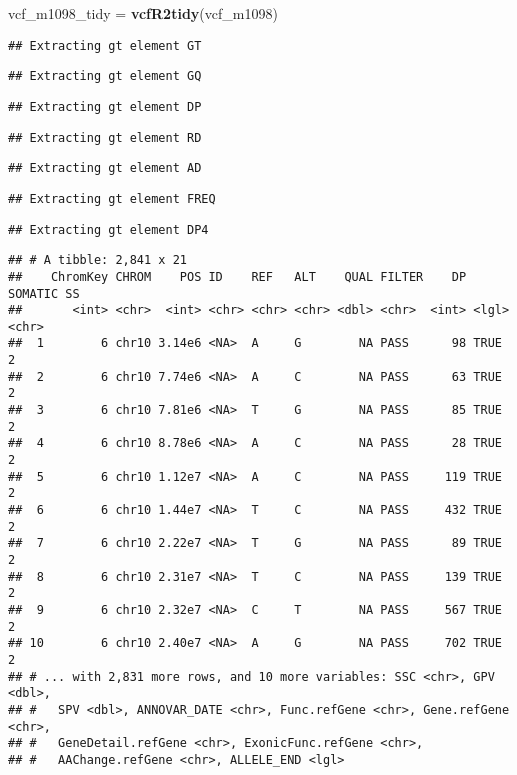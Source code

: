 \documentclass[]{article}
\newenvironment{Shaded}{\begin{snugshade}}{\end{snugshade}}
\newcommand{\KeywordTok}[1]{\textcolor[rgb]{0.13,0.29,0.53}{\textbf{#1}}}
\newcommand{\NormalTok}[1]{#1}
\newcommand{\OperatorTok}[1]{\textcolor[rgb]{0.81,0.36,0.00}{\textbf{#1}}}
\newcommand{\StringTok}[1]{\textcolor[rgb]{0.31,0.60,0.02}{#1}}
\begin{document}
\begin{Shaded}
\begin{Highlighting}[]
\NormalTok{vcf_m1098_tidy =}\StringTok{ }\KeywordTok{vcfR2tidy}\NormalTok{(vcf_m1098)}
\end{Highlighting}
\end{Shaded}

\begin{verbatim}
## Extracting gt element GT
\end{verbatim}

\begin{verbatim}
## Extracting gt element GQ
\end{verbatim}

\begin{verbatim}
## Extracting gt element DP
\end{verbatim}

\begin{verbatim}
## Extracting gt element RD
\end{verbatim}

\begin{verbatim}
## Extracting gt element AD
\end{verbatim}

\begin{verbatim}
## Extracting gt element FREQ
\end{verbatim}

\begin{verbatim}
## Extracting gt element DP4
\end{verbatim}

\begin{Shaded}
\end{Shaded}

\begin{verbatim}
## # A tibble: 2,841 x 21
##    ChromKey CHROM    POS ID    REF   ALT    QUAL FILTER    DP SOMATIC SS   
##       <int> <chr>  <int> <chr> <chr> <chr> <dbl> <chr>  <int> <lgl>   <chr>
##  1        6 chr10 3.14e6 <NA>  A     G        NA PASS      98 TRUE    2    
##  2        6 chr10 7.74e6 <NA>  A     C        NA PASS      63 TRUE    2    
##  3        6 chr10 7.81e6 <NA>  T     G        NA PASS      85 TRUE    2    
##  4        6 chr10 8.78e6 <NA>  A     C        NA PASS      28 TRUE    2    
##  5        6 chr10 1.12e7 <NA>  A     C        NA PASS     119 TRUE    2    
##  6        6 chr10 1.44e7 <NA>  T     C        NA PASS     432 TRUE    2    
##  7        6 chr10 2.22e7 <NA>  T     G        NA PASS      89 TRUE    2    
##  8        6 chr10 2.31e7 <NA>  T     C        NA PASS     139 TRUE    2    
##  9        6 chr10 2.32e7 <NA>  C     T        NA PASS     567 TRUE    2    
## 10        6 chr10 2.40e7 <NA>  A     G        NA PASS     702 TRUE    2    
## # ... with 2,831 more rows, and 10 more variables: SSC <chr>, GPV <dbl>,
## #   SPV <dbl>, ANNOVAR_DATE <chr>, Func.refGene <chr>, Gene.refGene <chr>,
## #   GeneDetail.refGene <chr>, ExonicFunc.refGene <chr>,
## #   AAChange.refGene <chr>, ALLELE_END <lgl>
\end{verbatim}
\end{document}
